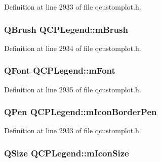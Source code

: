 Definition at line 2933 of file qcustomplot.\-h.

\hypertarget{class_q_c_p_legend_a9bd7cd05a9a485e06eda513a348baf80}{
\subsubsection[{m\-Brush}]{\setlength{\rightskip}{0pt plus 5cm}Q\-Brush Q\-C\-P\-Legend\-::m\-Brush\hspace{0.3cm}{\ttfamily [protected]}}}\label{class_q_c_p_legend_a9bd7cd05a9a485e06eda513a348baf80}


Definition at line 2934 of file qcustomplot.\-h.

\hypertarget{class_q_c_p_legend_a56ffacb184a99eefe09a0c7181d0713d}{
\subsubsection[{m\-Font}]{\setlength{\rightskip}{0pt plus 5cm}Q\-Font Q\-C\-P\-Legend\-::m\-Font\hspace{0.3cm}{\ttfamily [protected]}}}\label{class_q_c_p_legend_a56ffacb184a99eefe09a0c7181d0713d}


Definition at line 2935 of file qcustomplot.\-h.

\hypertarget{class_q_c_p_legend_a773ae518c3149fcabff4a2906fdacbc4}{
\subsubsection[{m\-Icon\-Border\-Pen}]{\setlength{\rightskip}{0pt plus 5cm}Q\-Pen Q\-C\-P\-Legend\-::m\-Icon\-Border\-Pen\hspace{0.3cm}{\ttfamily [protected]}}}\label{class_q_c_p_legend_a773ae518c3149fcabff4a2906fdacbc4}


Definition at line 2933 of file qcustomplot.\-h.

\hypertarget{class_q_c_p_legend_a39b972aae6c6a3fa5aa73313ab7a5765}{
\subsubsection[{m\-Icon\-Size}]{\setlength{\rightskip}{0pt plus 5cm}Q\-Size Q\-C\-P\-Legend\-::m\-Icon\-Size\hspace{0.3cm}{\ttfamily [protected]}}}\label{class_q_c_p_legend_a39b972aae6c6a3fa5aa73313ab7a5765}


